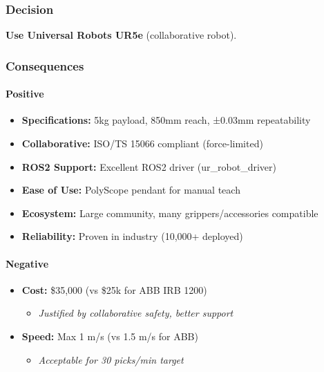 \documentclass[
]{article}
\providecommand{\tightlist}{%
  \setlength{\itemsep}{0pt}\setlength{\parskip}{0pt}}
\begin{document}
\hypertarget{decision-13}{%
\subsubsection{Decision}\label{decision-13}}

\textbf{Use Universal Robots UR5e} (collaborative robot).

\hypertarget{consequences-13}{%
\subsubsection{Consequences}\label{consequences-13}}

\hypertarget{positive-13}{%
\paragraph{Positive}\label{positive-13}}

\begin{itemize}
\tightlist
\item
  \textbf{Specifications:} 5kg payload, 850mm reach, ±0.03mm
  repeatability
\item
  \textbf{Collaborative:} ISO/TS 15066 compliant (force-limited)
\item
  \textbf{ROS2 Support:} Excellent ROS2 driver (ur\_robot\_driver)
\item
  \textbf{Ease of Use:} PolyScope pendant for manual teach
\item
  \textbf{Ecosystem:} Large community, many grippers/accessories
  compatible
\item
  \textbf{Reliability:} Proven in industry (10,000+ deployed)
\end{itemize}

\hypertarget{negative-13}{%
\paragraph{Negative}\label{negative-13}}

\begin{itemize}
\tightlist
\item
  \textbf{Cost:} \$35,000 (vs \$25k for ABB IRB 1200)

  \begin{itemize}
  \tightlist
  \item
    \emph{Justified by collaborative safety, better support}
  \end{itemize}
\item
  \textbf{Speed:} Max 1 m/s (vs 1.5 m/s for ABB)

  \begin{itemize}
  \tightlist
  \item
    \emph{Acceptable for 30 picks/min target}
  \end{itemize}
\end{itemize}
\end{document}
